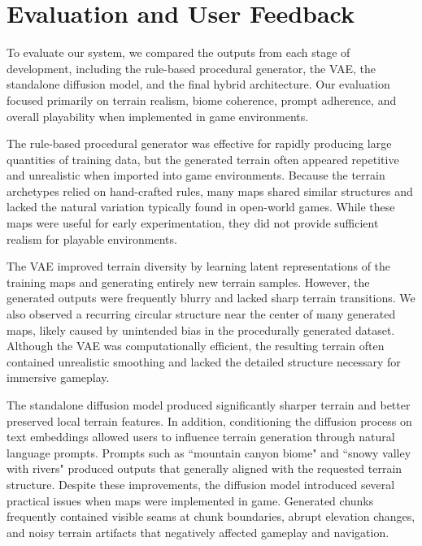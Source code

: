 \documentclass[conference]{IEEEtran}
\begin{document}
\section{Evaluation and User Feedback}

To evaluate our system, we compared the outputs from each stage of development, including the rule-based procedural generator, the VAE, the standalone diffusion model, and the final hybrid architecture. Our evaluation focused primarily on terrain realism, biome coherence, prompt adherence, and overall playability when implemented in game environments.

The rule-based procedural generator was effective for rapidly producing large quantities of training data, but the generated terrain often appeared repetitive and unrealistic when imported into game environments. Because the terrain archetypes relied on hand-crafted rules, many maps shared similar structures and lacked the natural variation typically found in open-world games. While these maps were useful for early experimentation, they did not provide sufficient realism for playable environments.

The VAE improved terrain diversity by learning latent representations of the training maps and generating entirely new terrain samples. However, the generated outputs were frequently blurry and lacked sharp terrain transitions. We also observed a recurring circular structure near the center of many generated maps, likely caused by unintended bias in the procedurally generated dataset. Although the VAE was computationally efficient, the resulting terrain often contained unrealistic smoothing and lacked the detailed structure necessary for immersive gameplay.

The standalone diffusion model produced significantly sharper terrain and better preserved local terrain features. In addition, conditioning the diffusion process on text embeddings allowed users to influence terrain generation through natural language prompts. Prompts such as ``mountain canyon biome" and ``snowy valley with rivers" produced outputs that generally aligned with the requested terrain structure. Despite these improvements, the diffusion model introduced several practical issues when maps were implemented in game. Generated chunks frequently contained visible seams at chunk boundaries, abrupt elevation changes, and noisy terrain artifacts that negatively affected gameplay and navigation.
\end{document}
